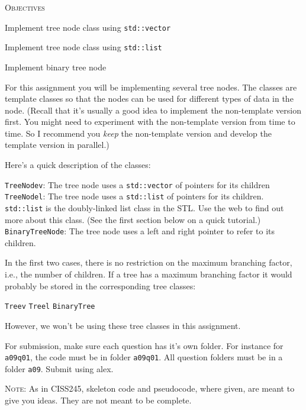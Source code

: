 \textsc{Objectives}
\begin{myenum}
\item Implement tree node class using \verb!std::vector!
\item Implement tree node class using \verb!std::list!
\item Implement binary tree node
\end{myenum}

For this assignment you will be implementing several tree nodes.
The classes are template classes so that the nodes can be used for
different types of data in the node.
(Recall that it's usually a good idea to implement the non-template version
first. You might need to experiment with the non-template version
from time to time. So I recommend you \textit{keep}
the non-template version and develop the template version in parallel.)

Here's a quick description of the classes:
\begin{myenum}
\li \verb!TreeNodev!: The tree node uses a \verb!std::vector! of pointers
for its children 
\li \verb!TreeNodel!: The tree node uses a \verb!std::list! of pointers
for its children.  
\verb!std::list! is the doubly-linked list class in the 
STL.
Use the web to find out more about this class.
(See the first section below on a quick tutorial.)
\li \verb!BinaryTreeNode!: The tree node uses a left and right pointer
to refer to its children.
\end{myenum} 

In the first two cases, 
there is no restriction on the maximum branching factor, i.e., 
the number of children.
If a tree has a maximum branching factor it 
would probably be stored in the corresponding tree classes:
\begin{myenum}
\li \verb!Treev!
\li \verb!Treel!
\li \verb!BinaryTree!
\end{myenum}
However, we won't be using these tree classes in this assignment.

For submission, make sure each question has it's own folder.
For instance for \verb!a09q01!, 
the code must be in folder \verb!a09q01!.
All question folders must be in a folder \verb!a09!.
Submit using alex.

\textsc{Note}: As in CISS245, skeleton code and pseudocode, where given,
are meant to give you ideas. They are not meant to be complete.
